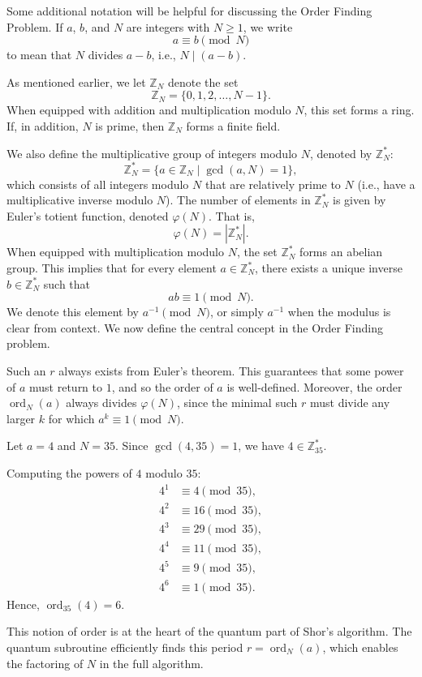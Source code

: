 Some additional notation will be helpful for discussing the Order Finding Problem. If $a$, $b$, and $N$ are integers with $N \geq 1$, we write
\[
a \equiv b \pmod{N}
\]
to mean that $N$ divides $a - b$, i.e., $N \mid (a - b)$.

As mentioned earlier, we let $\mathbb{Z}_N$ denote the set
\[
\mathbb{Z}_N = \{0, 1, 2, \ldots, N - 1\}.
\]
When equipped with addition and multiplication modulo $N$, this set forms a ring. If, in addition, $N$ is prime, then $\mathbb{Z}_N$ forms a finite field.

We also define the multiplicative group of integers modulo $N$, denoted by $\mathbb{Z}_N^*$:
\[
\mathbb{Z}_N^* = \{ a \in \mathbb{Z}_N \mid \gcd(a, N) = 1 \},
\]
which consists of all integers modulo $N$ that are relatively prime to $N$ (i.e., have a multiplicative inverse modulo $N$). The number of elements in $\mathbb{Z}_N^*$ is given by Euler’s totient function, denoted $\varphi(N)$. That is,
\[
\varphi(N) = |\mathbb{Z}_N^*|.
\]
When equipped with multiplication modulo $N$, the set $\mathbb{Z}_N^*$ forms an abelian group. This implies that for every element $a \in \mathbb{Z}_N^*$, there exists a unique inverse $b \in \mathbb{Z}_N^*$ such that
\[
ab \equiv 1 \pmod{N}.
\]
We denote this element by $a^{-1} \pmod{N}$, or simply $a^{-1}$ when the modulus is clear from context. We now define the central concept in the Order Finding problem.

Such an $r$ always exists from Euler's theorem. This guarantees that some power of $a$ must return to $1$, and so the order of $a$ is well-defined. Moreover, the order $\operatorname{ord}_N(a)$ always divides $\varphi(N)$, since the minimal such $r$ must divide any larger $k$ for which $a^k \equiv 1 \pmod{N}$.

Let $a = 4$ and $N = 35$. Since $\gcd(4, 35) = 1$, we have $4 \in \mathbb{Z}_{35}^*$.

Computing the powers of $4$ modulo $35$:
\[
\begin{aligned}
4^1 &\equiv 4 \pmod{35},\\
4^2 &\equiv 16 \pmod{35},\\
4^3 &\equiv 29 \pmod{35},\\
4^4 &\equiv 11 \pmod{35},\\
4^5 &\equiv 9 \pmod{35},\\
4^6 &\equiv 1 \pmod{35}.
\end{aligned}
\]
Hence, $\operatorname{ord}_{35}(4) = 6$.

\medskip

This notion of order is at the heart of the quantum part of Shor’s algorithm. The quantum subroutine efficiently finds this period $r = \operatorname{ord}_N(a)$, which enables the factoring of $N$ in the full algorithm.


